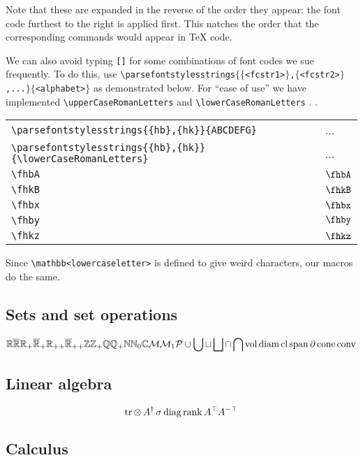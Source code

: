 \documentclass{article}
\begin{document}
Note that these are expanded in the reverse of the order they appear: the font code furthest to the right is applied first. This natches the order that the corresponding commands would appear in TeX code.

We can also avoid typing \texttt{[]} for some combinations of font codes we sue frequently.
To do this, use \texttt{\textbackslash parsefontstylesstrings$\{\{$<fcstr1>$\}$,$\{$<fcstr2>$\}$,...$\}\{$<alphabet>$\}$} as demonstrated below. For ``ease of use'' we have implemented \texttt{\textbackslash upperCaseRomanLetters} and \texttt{\textbackslash lowerCaseRomanLetters}
. 
. 

\begin{tabular}{ll}
	\verb!\parsefontstylesstrings{{hb},{hk}}{ABCDEFG}! & ...\\
	\verb!\parsefontstylesstrings{{hb},{hk}}{\lowerCaseRomanLetters}! & ...\\
    \verb!\fhbA! & $\fhbA$ \\
	\verb!\fhkB! & $\fhkB$ \\
	\verb!\fhbx! & $\fhbx$ \\
	\verb!\fhby! & $\fhby$ \\
	\verb!\fhkz! & $\fhkz$ \\
\end{tabular}

Since \texttt{\textbackslash mathbb{<lowercaseletter>}} is defined to give weird characters, our macros do the same.


\subsection{Sets and set operations}

\[
\mathbb{R} \overline{\mathbb{R}} \mathbb{R}_+ {\overline{\mathbb{R}}}_+ \mathbb{R}_{++} {\overline{\mathbb{R}}}_{++}
\mathbb{Z} \mathbb{Z}_+ \mathbb{Q} \mathbb{Q}_+ \mathbb{N} \mathbb{N}_{0} \mathbb{C} \mathcal{M}
\mathcal{M}_1 \mathcal{P} \cup \bigcup \sqcup \bigsqcup
\cap \bigcap \operatorname{vol} \operatorname{diam} \operatorname{cl} \operatorname{span} \partial \operatorname{cone} \operatorname{conv}
\]

\subsection{Linear algebra}

\[
\operatorname{tr} \operatorname{\otimes} A^{\dag} \operatorname{\sigma} \operatorname{diag} \operatorname{rank} A^{\top} A^{-\top}
\]

\subsection{Calculus}
\end{document}
